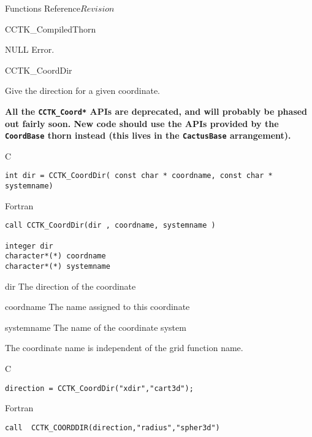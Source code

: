\begin{cactuspart}{ Functions Reference}{}{$Revision$}
\begin{FunctionDescription}{CCTK\_CompiledThorn}
\begin{ErrorSection}
\begin{Error}{NULL}
Error.
\end{Error}
\end{ErrorSection}
\end{FunctionDescription}


\begin{FunctionDescription}{CCTK\_CoordDir}%
{Give the direction for a given coordinate.

\textbf{All the \texttt{CCTK\_Coord*} APIs are deprecated,
and will probably be phased out fairly soon.
New code should use the APIs provided by the \texttt{CoordBase} thorn
instead (this lives in the \texttt{CactusBase} arrangement).}
}
\label{CCTK-CoordDir}
\begin{SynopsisSection}
\begin{Synopsis}{C}
\begin{verbatim}int dir = CCTK_CoordDir( const char * coordname, const char * systemname)\end{verbatim}
\end{Synopsis}
\begin{Synopsis}{Fortran}
\begin{verbatim}call CCTK_CoordDir(dir , coordname, systemname )

integer dir
character*(*) coordname
character*(*) systemname \end{verbatim}
\end{Synopsis}
\end{SynopsisSection}
\begin{ParameterSection}
\begin{Parameter}{dir}
The direction of the coordinate
\end{Parameter}
\begin{Parameter}{coordname}
The name assigned to this coordinate
\end{Parameter}
\begin{Parameter}{systemname}
The name of the coordinate system
\end{Parameter}
\end{ParameterSection}
\begin{Discussion}
The coordinate name is independent of the grid function name.
\end{Discussion}
\begin{ExampleSection}
\begin{Example}{C}
\begin{verbatim}
direction = CCTK_CoordDir("xdir","cart3d");
\end{verbatim}
\end{Example}
\begin{Example}{Fortran}
\begin{verbatim}
call  CCTK_COORDDIR(direction,"radius","spher3d")
\end{verbatim}
\end{Example}
\end{ExampleSection}
\end{FunctionDescription}


\end{cactuspart}
